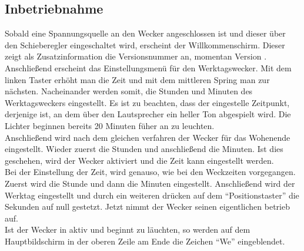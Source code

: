 \documentclass[12pt,a4paper,titlepage,headinclude]{scrartcl}
\numberwithin{equation}{subsection}
\begin{document}
\subsection{Inbetriebnahme}
\label{sec:inbetriebname}
Sobald eine Spannungsquelle an den Wecker angeschlossen ist und dieser über den Schieberegler eingeschaltet wird, erscheint der Willkommenschirm.
Dieser zeigt als Zusatzinformation die Versionsnummer an, momentan Version \titel.
Anschließend erscheint das Einstellungsmenü für den Werktagswecker.
Mit dem linken Taster erhöht man die Zeit und mit dem mittleren Spring man zur nächsten.
Nacheinander werden somit, die Stunden und Minuten des Werktagsweckers eingestellt.
Es ist zu beachten, dass der eingestelle Zeitpunkt, derjenige ist, an dem über den Lautsprecher ein heller Ton abgespielt wird.
Die Lichter beginnen bereits 20 Minuten füher an zu leuchten.\\
Anschließend wird nach dem gleichen verfahren der Wecker für das Wohenende eingestellt.
Wieder zuerst die Stunden und anschließend die Minuten.
Ist dies geschehen, wird der Wecker aktiviert und die Zeit kann eingestellt werden.\\
Bei der Einstellung der Zeit, wird genauso, wie bei den Weckzeiten vorgegangen.
Zuerst wird die Stunde und dann die Minuten eingestellt.
Anschließend wird der Werktag eingestellt und durch ein weiteren drücken auf dem "`Positionstaster"' die Sekunden auf null gestetzt.
Jetzt nimmt der Wecker seinen eigentlichen betrieb auf.\\
Ist der Wecker in aktiv und beginnt zu läuchten, so werden auf dem Hauptbildschirm in der oberen Zeile am Ende die Zeichen "`We"' eingeblendet.
\end{document}
